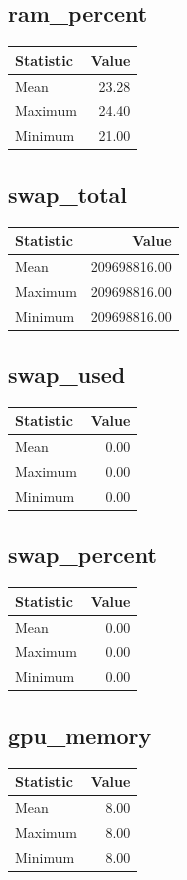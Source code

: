 \documentclass[11pt]{article}
\begin{document}
\subsection{ram_percent}
\begin{tabular}{lr}
\toprule
Statistic & Value \\
\midrule
Mean & 23.28 \\
Maximum & 24.40 \\
Minimum & 21.00 \\
\bottomrule
\end{tabular}


\subsection{swap_total}
\begin{tabular}{lr}
\toprule
Statistic & Value \\
\midrule
Mean & 209698816.00 \\
Maximum & 209698816.00 \\
Minimum & 209698816.00 \\
\bottomrule
\end{tabular}


\subsection{swap_used}
\begin{tabular}{lr}
\toprule
Statistic & Value \\
\midrule
Mean & 0.00 \\
Maximum & 0.00 \\
Minimum & 0.00 \\
\bottomrule
\end{tabular}


\subsection{swap_percent}
\begin{tabular}{lr}
\toprule
Statistic & Value \\
\midrule
Mean & 0.00 \\
Maximum & 0.00 \\
Minimum & 0.00 \\
\bottomrule
\end{tabular}


\subsection{gpu_memory}
\begin{tabular}{lr}
\toprule
Statistic & Value \\
\midrule
Mean & 8.00 \\
Maximum & 8.00 \\
Minimum & 8.00 \\
\bottomrule
\end{tabular}
\end{document}
